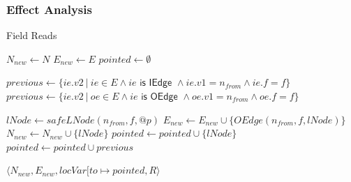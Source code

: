 \documentclass[hyperref={pdfpagelabels=false}]{beamer}
\begin{document}
\begin{frame}[fragile,shrink=20]
    \frametitle{Effect Analysis}
    \begin{algorithm}[H]
        \caption{Field Reads}\label{algo:pt:reads}
        \begin{algorithmic}[1]
            \State $N_{new} \gets N$
            \State $E_{new} \gets E$
            \State $pointed \gets \emptyset$

                \State $previous \gets \{ ie.v2 ~|~ ie \in E \land ie \textsf{ is IEdge } \land ie.v1 = n_{from} \land ie.f = f \}$
                    \State $previous \gets \{ ie.v2 ~|~ oe \in E \land ie \textsf{ is OEdge } \land oe.v1 = n_{from} \land oe.f = f \}$
                \EndIf

                    \State $lNode \gets safeLNode(n_{from}, f, @p)$
                    \State $E_{new} \gets E_{new} \cup \{ OEdge(n_{from}, f, lNode) \}$
                    \State $N_{new} \gets N_{new} \cup \{ lNode \}$
                    \State $pointed \gets pointed \cup \{ lNode \}$
                \Else
                    \State $pointed \gets pointed \cup previous$
                \EndIf
            \EndFor

            \State \Return $\langle N_{new}, E_{new}, locVar[ to \mapsto pointed, R \rangle$
        \EndFunction
        \end{algorithmic}
    \end{algorithm}
\end{frame}
\end{document}
